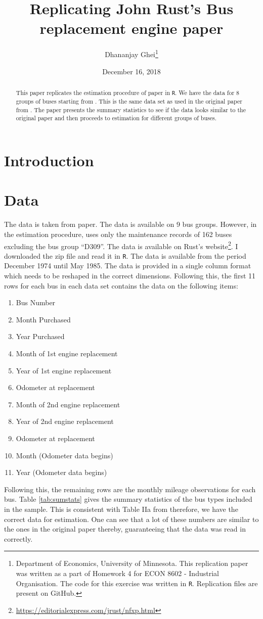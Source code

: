 \documentclass[11pt,letterpaper]{article}
\title{Replicating John Rust's Bus replacement engine paper}
\author{Dhananjay Ghei\footnote{Department of Economics, University of
    Minnesota. This replication paper was written as a part of
    Homework 4 for ECON 8602 - Industrial Organisation. The code for
    this exercise was written in \texttt{R}. Replication files are
    present on GitHub.}}  \date{December 16, 2018}
\begin{document}
\maketitle
\begin{abstract}
This paper replicates the estimation procedure of
\citet{rust1987optimal} paper in \texttt{R}. We have the data for 8
groups of buses starting from . This is the same data set as used in
the original paper from \citet{rust1987optimal}. The paper presents
the summary statistics to see if the data looks similar to the
original paper and then proceeds to estimation for different groups of
buses.
\end{abstract}
\newpage
\tableofcontents
\section{Introduction}

\section{Data}
The data is taken from \citet{rust1987optimal} paper. The data is
available on 9 bus groups. However, in the estimation procedure,
\citet{rust1987optimal} uses only the maintenance records of 162 buses
excluding the bus group ``D309''. The data is available on Rust's
website\footnote{\url{https://editorialexpress.com/jrust/nfxp.html}}. I
downloaded the zip file and read it in \texttt{R}. The data is
available from the period December 1974 until May 1985. The data is
provided in a single column format which needs to be reshaped in the
correct dimensions. Following this, the first 11 rows for each bus in
each data set contains the data on the following items:
\begin{enumerate}
\item Bus Number
\item Month Purchased
\item Year Purchased
\item Month of 1st engine replacement
\item Year of 1st engine replacement
\item Odometer at replacement
\item Month of 2nd engine replacement
\item Year of 2nd engine replacement
\item Odometer at replacement
\item Month (Odometer data begins)
\item Year (Odometer data begins)
\end{enumerate}
Following this, the remaining rows are the monthly mileage
observations for each bus. Table \ref{tab:sumstats} gives the summary
statistics of the bus types included in the sample. This is consistent
with Table IIa from \citet{rust1987optimal} therefore, we have the
correct data for estimation. One can see that a lot of these numbers
are similar to the ones in the original paper thereby, guaranteeing
that the data was read in correctly.
\end{document}
